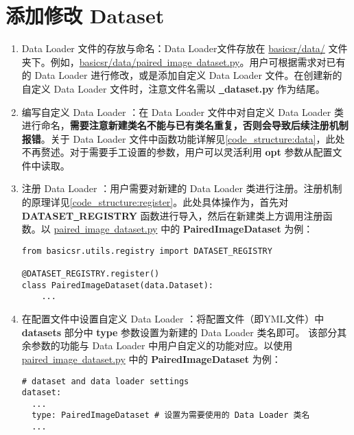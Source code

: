 \documentclass[../main.tex]{subfiles}
\begin{document}
\section{添加修改 Dataset}\label{howto:add_dataset}
\begin{enumerate}
	\item Data Loader 文件的存放与命名：Data Loader文件存放在 \href{https://github.com/XPixelGroup/BasicSR/tree/master/basicsr/data}{basicsr/data/} 文件夹下。例如，\href{https://github.com/XPixelGroup/BasicSR/tree/master/basicsr/data}{basicsr/data/paired\underline{~}image\underline{~}dataset.py}。用户可根据需求对已有的 Data Loader 进行修改，或是添加自定义 Data Loader 文件。在创建新的自定义 Data Loader 文件时，注意文件名需以  \textbf{\underline{~}dataset.py} 作为结尾。
	
	\item 编写自定义 Data Loader ：在 Data Loader 文件中对自定义 Data Loader 类进行命名，\textbf{需要注意新建类名不能与已有类名重复，否则会导致后续注册机制报错}。关于 Data Loader 文件中函数功能详解见\ref{code_structure:data}，此处不再赘述。对于需要手工设置的参数，用户可以灵活利用 \textbf{opt} 参数从配置文件中读取。
	
	\item 注册 Data Loader ：用户需要对新建的 Data Loader 类进行注册。注册机制的原理详见\ref{code_structure:register}。此处具体操作为，首先对 \textbf{DATASET\underline{~}REGISTRY} 函数进行导入，然后在新建类上方调用注册函数。以 \href{https://github.com/XPixelGroup/BasicSR/tree/master/basicsr/data/paired_image_dataset.py}{paired\underline{~}image\underline{~}dataset.py} 中的 \textbf{PairedImageDataset} 为例：
\begin{verbatim}
from basicsr.utils.registry import DATASET_REGISTRY

@DATASET_REGISTRY.register()
class PairedImageDataset(data.Dataset):
    ...
\end{verbatim}
	
	\item 在配置文件中设置自定义 Data Loader ：将配置文件（即YML文件）中 \textbf{datasets} 部分中 \textbf{type} 参数设置为新建的 Data Loader 类名即可。
	该部分其余参数的功能与 Data Loader 中用户自定义的功能对应。以使用 \href{https://github.com/XPixelGroup/BasicSR/tree/master/basicsr/data/paired_image_dataset.py}{paired\underline{~}image\underline{~}dataset.py} 中的 \textbf{PairedImageDataset} 为例：
\begin{verbatim}
# dataset and data loader settings
dataset:
  ...
  type: PairedImageDataset # 设置为需要使用的 Data Loader 类名
  ...
\end{verbatim}
\end{enumerate}
\end{document}
